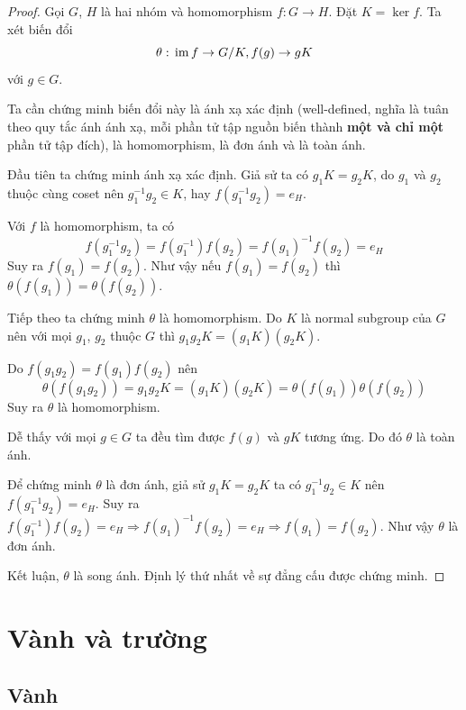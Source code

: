 \begin{proof}
    Gọi $G$, $H$ là hai nhóm và homomorphism $f: G \to H$.
    Đặt $K = \ker f$. Ta xét biến đổi \[\theta:\,\operatorname{im} f \to G / K, f(g) \to g K \] với $g \in G$.

    Ta cần chứng minh biến đổi này là ánh xạ xác định (well-defined, nghĩa là tuân theo quy tắc ánh ánh xạ, mỗi phần tử tập nguồn biến thành \textbf{một và chỉ một} phần tử tập đích), là homomorphism, là đơn ánh và là toàn ánh.

    Đầu tiên ta chứng minh ánh xạ xác định. Giả sử ta có $g_1 K = g_2 K$, do $g_1$ và $g_2$ thuộc cùng coset nên $g_1^{-1} g_2 \in K$, hay $f(g_1^{-1} g_2) = e_H$.
    
    Với $f$ là homomorphism, ta có 
    \[f(g_1^{-1} g_2) = f(g_1^{-1}) f(g_2) = f(g_1)^{-1} f(g_2) = e_H\]
    Suy ra $f(g_1) = f(g_2)$. Như vậy nếu $f(g_1) = f(g_2)$ thì $\theta (f(g_1)) = \theta (f(g_2))$.

    Tiếp theo ta chứng minh $\theta$ là homomorphism. Do $K$ là normal subgroup của $G$ nên với mọi $g_1$, $g_2$ thuộc $G$ thì $g_1 g_2 K = (g_1 K) (g_2 K)$.

    Do $f(g_1 g_2) = f(g_1) f(g_2)$ nên 
    \[ \theta (f(g_1 g_2)) = g_1 g_2 K = (g_1 K) (g_2 K) = \theta (f(g_1)) 
    \theta (f(g_2)) \]
    Suy ra $\theta$ là homomorphism.

    Dễ thấy với mọi $g \in G$ ta đều tìm được $f(g)$ và $g K$ tương ứng. Do đó $\theta$ là toàn ánh.

    Để chứng minh $\theta$ là đơn ánh, giả sử $g_1 K = g_2 K$ ta có $g_1^{-1} g_2 \in K$ nên $f(g_1^{-1} g_2) = e_H$. Suy ra $f(g_1^{-1}) f(g_2) = e_H \Rightarrow f(g_1)^{-1} f(g_2) = e_H \Rightarrow f(g_1) = f(g_2)$. Như vậy $\theta$ là đơn ánh.

    Kết luận, $\theta$ là song ánh. Định lý thứ nhất về sự đẳng cấu được chứng minh.
\end{proof}

\section{Vành và trường}

\subsection*{Vành}

